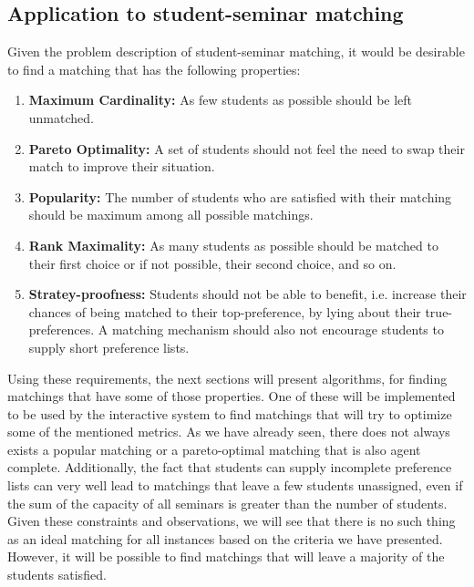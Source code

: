 \subsection{Application to student-seminar matching}\label{criteria-application}
Given the problem description of student-seminar matching, it would be desirable to find a matching that has the following properties:
\begin{enumerate}
    \item \textbf{Maximum Cardinality:} As few students as possible should be left unmatched.
    \item \textbf{Pareto Optimality:} A set of students should not feel the need to swap their match to improve their situation.
    \item \textbf{Popularity:} The number of students who are satisfied with their matching should be maximum among all possible matchings.
    \item \textbf{Rank Maximality:} As many students as possible should be matched to their first choice or if not possible, their second choice, and so on.
    \item \textbf{Stratey-proofness:} Students should not be able to benefit, i.e. increase their chances of being matched to their top-preference, by lying about their true-preferences. A matching mechanism should also not encourage students to supply short preference lists.
\end{enumerate}
Using these requirements, the next sections will present algorithms, for finding matchings that have some of those properties. One of these will be implemented to be used by the interactive system to find matchings that will try to optimize some of the mentioned metrics. As we have already seen, there does not always exists a popular matching or a pareto-optimal matching that is also agent complete. Additionally, the fact that students can supply incomplete preference lists can very well lead to matchings that leave a few students unassigned, even if the sum of the capacity of all seminars is greater than the number of students. Given these constraints and observations, we will see that there is no such thing as an ideal matching for all instances based on the criteria we have presented. However, it will be possible to find matchings that will leave a majority of the students satisfied.